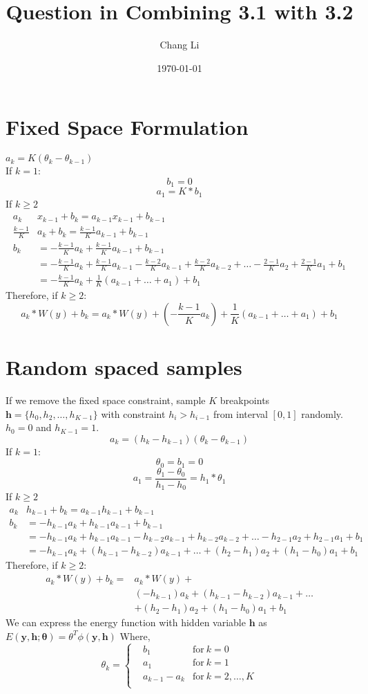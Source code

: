 \documentclass{article}
\title{Question in Combining 3.1 with 3.2}
\author{Chang Li}
\date{\today}
\begin{document}
	\maketitle
	\section{Fixed Space Formulation}
	$a_k=K(\theta_k-\theta_{k-1})$\\
	If $k =1$:
	$$
	b_1 = 0
	$$
	$$
	a_1 = K*b_1
	$$
	If $k \geq 2$
	\begin{align*}
	a_k&x_{k-1}+b_k= a_{k-1}x_{k-1}+b_{k-1}\\
	\frac{k-1}{K}&a_k+b_k=\frac{k-1}{K}a_{k-1}+b_{k-1}\\
	b_k &= -\frac{k-1}{K}a_k+\frac{k-1}{K}a_{k-1}+b_{k-1}\\
	&=-\frac{k-1}{K}a_k+\frac{k-1}{K}a_{k-1}-\frac{k-2}{K}a_{k-1}+\frac{k-2}{K}a_{k-2}+\dots-\frac{2-1}{K}a_2+\frac{2-1}{K}a_1+b_1\\
	&=-\frac{k-1}{K}a_k+\frac{1}{K}(a_{k-1}+\dots+a_1)+b_1
	\end{align*}
	Therefore, if $k \geq 2$:
	$$
	a_k*W(y)+b_k=a_k*W(y)+ (-\frac{k-1}{K}a_k)+\frac{1}{K}(a_{k-1}+\dots+a_1)+b_1
	$$
	\section{Random spaced samples}
	If we remove the fixed space constraint, sample $K$ breakpoints $\mathbf{h}=\{h_0,h_2,\dots,h_{K-1}\}$ with constraint $h_i>h_{i-1}$ from interval $[0,1]$ randomly. $h_0=0$ and $h_{K-1}=1$.\\
	$$a_k=(h_k-h_{k-1})(\theta_k-\theta_{k-1})$$
	If $k =1$:
	$$
	\theta_0=b_1 = 0
	$$
	$$
	a_1 =\frac{\theta_1-\theta_0}{h_1-h_0}= h_1*\theta_1
	$$
	If $k \geq 2$
	\begin{align*}
	a_k&h_{k-1}+b_k = a_{k-1}h_{k-1}+b_{k-1}\\
	b_k&= -h_{k-1}a_k+h_{k-1}a_{k-1}+b_{k-1}\\
	&=-h_{k-1}a_k+h_{k-1}a_{k-1}-h_{k-2}a_{k-1}+h_{k-2}a_{k-2}+\dots-h_{2-1}a_2+h_{2-1}a_1+b_1\\
	&=-h_{k-1}a_k+(h_{k-1}-h_{k-2})a_{k-1}+\dots+(h_2-h_1)a_2+(h_1-h_0)a_1+b_1
	\end{align*}
	Therefore, if $k \geq 2$:
	\begin{align*}
	a_k*W(y)+b_k=&a_k*W(y)+\\
	&(-h_{k-1})a_k+(h_{k-1}-h_{k-2})a_{k-1}+\dots\\
	&+(h_2-h_1)a_2+(h_1-h_0)a_1+b_1
	\end{align*}
	We can express the energy function with hidden variable $\mathbf{h}$ as $E(\mathbf{y},\mathbf{h};\mathbf{\theta})=\mathbb{\theta}^T\phi(\mathbf{y},\mathbf{h})$
	Where,
	\begin{equation*}
	\theta_k = \left\{
	\begin{aligned}
	& b_1	& \text{for} \ k=0\\
	& a_1 & \text{for}\ k=1\\
	& a_{k-1}-a_k  & \text{for} \ k=2,\dots,K\\
	\end{aligned}
	\right.
	\end{equation*}
	
\end{document}
